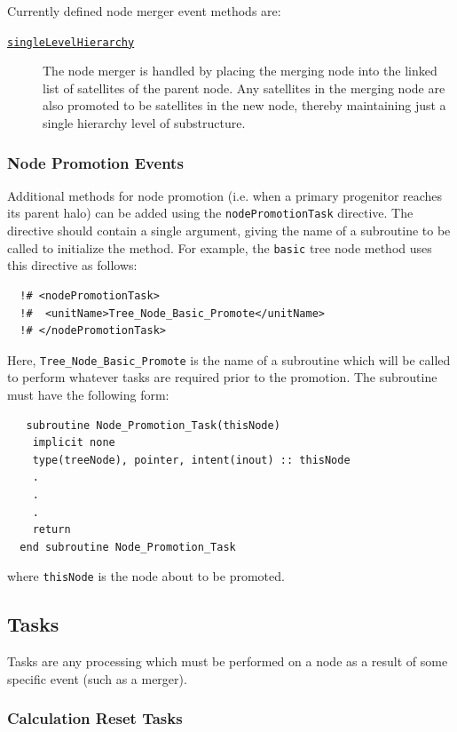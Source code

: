 Currently defined node merger event methods are:
\begin{description}
 \item [\hyperlink{events.node_merger.single_level_hierarchy.F90:events_node_mergers_slh:events_node_merger_do_slh}{{\tt singleLevelHierarchy}}] The node merger is handled by placing the merging node into the linked list of satellites of the parent node. Any satellites in the merging node are also promoted to be satellites in the new node, thereby maintaining just a single hierarchy level of substructure.
\end{description}

\subsubsection{Node Promotion Events}

Additional methods for node promotion (i.e. when a primary progenitor reaches its parent halo) can be added using the {\tt nodePromotionTask} directive. The directive should contain a single argument, giving the name of a subroutine to be called to initialize the method. For example, the {\tt basic} tree node method uses this directive as follows:
\begin{verbatim}
  !# <nodePromotionTask>
  !#  <unitName>Tree_Node_Basic_Promote</unitName>
  !# </nodePromotionTask>
\end{verbatim}
Here, {\tt Tree\_Node\_Basic\_Promote} is the name of a subroutine which will be called to perform whatever tasks are required prior to the promotion. The subroutine must have the following form:
\begin{verbatim}
   subroutine Node_Promotion_Task(thisNode)
    implicit none
    type(treeNode), pointer, intent(inout) :: thisNode
    .
    .
    .
    return
  end subroutine Node_Promotion_Task
\end{verbatim}
where {\tt thisNode} is the node about to be promoted.

\subsection{Tasks}

Tasks are any processing which must be performed on a node as a result of some specific event (such as a merger).

\subsubsection{Calculation Reset Tasks}\label{sec:CalculationResetTask}

